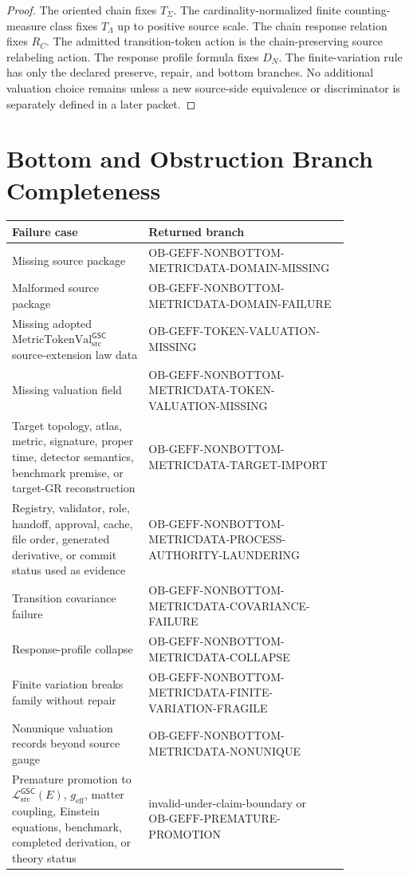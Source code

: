 \documentclass[11pt]{article}
\newcommand{\MetricTokenVal}{\mathrm{MetricTokenVal}_{\mathrm{src}}^{\mathsf{GSC}}}
\newcommand{\MetricData}{\mathcal{L}_{\mathrm{src}}^{\mathsf{GSC}}}
\newcommand{\OBGEFF}{\mathrm{OB\mbox{-}GEFF}}
\newcommand{\geff}{g_{\mathrm{eff}}}
\begin{document}
\begin{proof}
The oriented chain fixes \(T_{\Sigma}\). The cardinality-normalized finite
counting-measure class fixes \(T_{\Lambda}\) up to positive source scale. The
chain response relation fixes \(R_C\). The admitted transition-token action is
the chain-preserving source relabeling action. The response profile formula
fixes \(D_N\). The finite-variation rule has only the declared preserve,
repair, and bottom branches. No additional valuation choice remains unless a
new source-side equivalence or discriminator is separately defined in a later
packet.
\end{proof}

\section{Bottom and Obstruction Branch Completeness}

\begin{longtable}{p{0.34\linewidth}p{0.50\linewidth}}
\toprule
Failure case & Returned branch \\
\midrule
Missing source package &
\(\OBGEFF\)-NONBOTTOM-METRICDATA-DOMAIN-MISSING \\
Malformed source package &
\(\OBGEFF\)-NONBOTTOM-METRICDATA-DOMAIN-FAILURE \\
Missing adopted \(\MetricTokenVal\) source-extension law data &
\(\OBGEFF\)-TOKEN-VALUATION-MISSING \\
Missing valuation field &
\(\OBGEFF\)-NONBOTTOM-METRICDATA-TOKEN-VALUATION-MISSING \\
Target topology, atlas, metric, signature, proper time, detector semantics,
benchmark premise, or target-GR reconstruction &
\(\OBGEFF\)-NONBOTTOM-METRICDATA-TARGET-IMPORT \\
Registry, validator, role, handoff, approval, cache, file order, generated
derivative, or commit status used as evidence &
\(\OBGEFF\)-NONBOTTOM-METRICDATA-PROCESS-AUTHORITY-LAUNDERING \\
Transition covariance failure &
\(\OBGEFF\)-NONBOTTOM-METRICDATA-COVARIANCE-FAILURE \\
Response-profile collapse &
\(\OBGEFF\)-NONBOTTOM-METRICDATA-COLLAPSE \\
Finite variation breaks family without repair &
\(\OBGEFF\)-NONBOTTOM-METRICDATA-FINITE-VARIATION-FRAGILE \\
Nonunique valuation records beyond source gauge &
\(\OBGEFF\)-NONBOTTOM-METRICDATA-NONUNIQUE \\
Premature promotion to \(\MetricData(E)\), \(\geff\), matter coupling,
Einstein equations, benchmark, completed derivation, or theory status &
invalid-under-claim-boundary or \(\OBGEFF\)-PREMATURE-PROMOTION \\
\bottomrule
\end{longtable}
\end{document}
